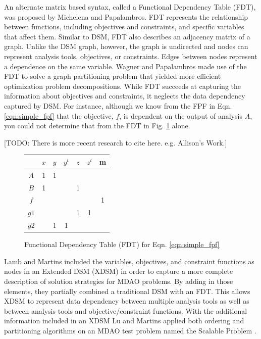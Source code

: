     An alternate matrix based syntax, called a Functional Dependency Table (FDT), was proposed by Michelena and Papalambros. 
    FDT represents the relationship between functions, including objectives and constraints, and specific variables that affect 
    them\cite{Michelena1997}. Similar to DSM, FDT also describes an adjacency matrix of a graph. Unlike the DSM graph, 
    however, the graph is undirected and nodes can represent analysis tools, objectives, 
    or constraints. Edges between nodes represent a dependence on the same 
    variable. Wagner and Papalambros made use of the FDT to solve a graph partitioning problem that yielded 
    more efficient optimization problem decompositions\cite{Wagner1993}. While FDT succeeds at capturing the 
    information about objectives and constraints, it neglects the data dependency captured by DSM. For instance, 
    although we know from the FPF in Eqn. \ref{eqn:simple_fpf} that the objective, $f$, is dependent on the 
    output of analysis $A$, you could not determine that from the FDT in Fig. \ref{fig:FDT_simple} alone. 
    
    [TODO: There is more recent research to cite here. e.g. Allison's Work.]

    \begin{figure}
        \begin{center}
        \begin{tabular}{|c|c|c|c|c|c|c|}
            \hline
                 & $x$ & $y$ & $y^t$ & $z$ & $z^t$ & m \\ \hline
            $A$  & 1  & 1    &       &     &       &   \\ \hline
            $B$  & 1  &      &       & 1   &       &   \\ \hline
            $f$  &    &      &       &     &       & 1 \\ \hline
            $g1$ &    &      &       & 1   & 1     &   \\ \hline
            $g2$ &    & 1    & 1     &     &       &   \\
            \hline
        \end{tabular}
        \caption{Functional Dependency Table (FDT) for Eqn. \ref{eqn:simple_fpf} \label{fig:FDT_simple}}
        \end{center}
    \end{figure}

    Lamb and Martins included the variables, objectives, and constraint functions as nodes in an Extended 
    DSM (XDSM) in order to capture a more complete description of solution strategies for MDAO problems\cite{Lambe2012}. By adding in those 
    elements, they partially combined a traditional DSM with an FDT. This allows XDSM to represent data 
    dependency between multiple analysis tools as well as between analysis tools and objective/constraint functions. 
    With the additional information included in an XDSM Lu and Martins applied both ordering and partitioning 
    algorithms on an MDAO test problem named the Scalable Problem \cite{Lu2012}. 

